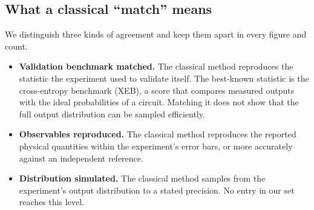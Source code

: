 \documentclass[10pt,a4paper]{article}
\begin{document}
\subsection{What a classical ``match'' means}
\label{sec:match}
We distinguish three kinds of agreement and keep them apart in every figure and count.
\begin{itemize}
\item \textbf{Validation benchmark matched.} The classical method reproduces the statistic the experiment used to validate itself. The best-known statistic is the cross-entropy benchmark (XEB), a score that compares measured outputs with the ideal probabilities of a circuit. Matching it does not show that the full output distribution can be sampled efficiently.
\item \textbf{Observables reproduced.} The classical method reproduces the reported physical quantities within the experiment's error bars, or more accurately against an independent reference.
\item \textbf{Distribution simulated.} The classical method samples from the experiment's output distribution to a stated precision. No entry in our set reaches this level.
\end{itemize}
\end{document}
